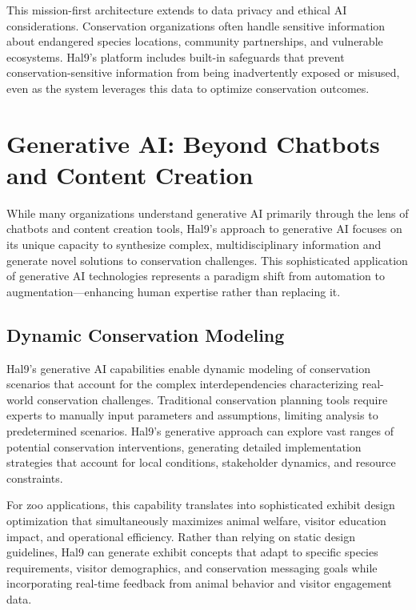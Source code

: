 \documentclass[
  Letterpaper,
]{scrbook}
\begin{document}
This mission-first architecture extends to data privacy and ethical AI
considerations. Conservation organizations often handle sensitive
information about endangered species locations, community partnerships,
and vulnerable ecosystems. Hal9's platform includes built-in safeguards
that prevent conservation-sensitive information from being inadvertently
exposed or misused, even as the system leverages this data to optimize
conservation outcomes.

\section{Generative AI: Beyond Chatbots and Content
Creation}\label{generative-ai-beyond-chatbots-and-content-creation}

While many organizations understand generative AI primarily through the
lens of chatbots and content creation tools, Hal9's approach to
generative AI focuses on its unique capacity to synthesize complex,
multidisciplinary information and generate novel solutions to
conservation challenges. This sophisticated application of generative AI
technologies represents a paradigm shift from automation to
augmentation---enhancing human expertise rather than replacing it.

\subsection{Dynamic Conservation
Modeling}\label{dynamic-conservation-modeling}

Hal9's generative AI capabilities enable dynamic modeling of
conservation scenarios that account for the complex interdependencies
characterizing real-world conservation challenges. Traditional
conservation planning tools require experts to manually input parameters
and assumptions, limiting analysis to predetermined scenarios. Hal9's
generative approach can explore vast ranges of potential conservation
interventions, generating detailed implementation strategies that
account for local conditions, stakeholder dynamics, and resource
constraints.

For zoo applications, this capability translates into sophisticated
exhibit design optimization that simultaneously maximizes animal
welfare, visitor education impact, and operational efficiency. Rather
than relying on static design guidelines, Hal9 can generate exhibit
concepts that adapt to specific species requirements, visitor
demographics, and conservation messaging goals while incorporating
real-time feedback from animal behavior and visitor engagement data.
\end{document}

